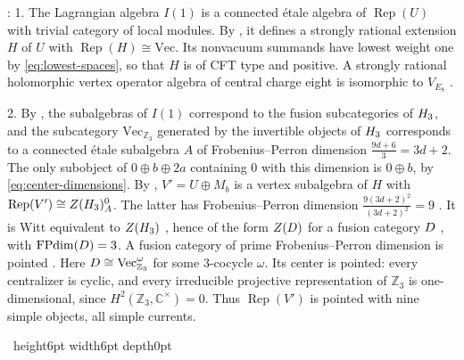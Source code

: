 \documentclass[leqno]{article}
\newcommand{\Cbb}{\ensuremath{\mathbb{C}}}
\let\cal\relax
\newcommand{\cal}{\mathcal}
\newcommand{\Z}{\ensuremath{\mathbb{Z}}}
\newcommand{\qed}{\hfill \vrule height6pt  width6pt depth0pt}
\DeclareMathOperator{\Rep}{Rep}
\newenvironment{proof}[1][]{\noindent {\it Proof #1} : }{\hbox{~}\qed
\smallskip
}
\numberwithin{equation}{section}
\begin{document}
\begin{proof}
1. The Lagrangian algebra $I(1)$ is a connected étale algebra of $\Rep(U)$ with trivial category of local modules. By \cite{HKL15,CKM22}, it defines a strongly rational extension $H$ of $U$ with $\Rep(H) \cong \mathrm{Vec}$. Its nonvacuum summands have lowest weight one by \eqref{eq:lowest-spaces}, so that $H$ is of CFT type and positive. A strongly rational holomorphic vertex operator algebra of central charge eight is isomorphic to $V_{E_8}$ \cite[Theorem 1 p.~2]{DoM04b}.

2. By \cite[Theorem 4.10 p.~18]{DMNO13}, the subalgebras of $I(1)$ correspond to the fusion subcategories of $\cal H_3$, and the subcategory $\mathrm{Vec}_{\Z_3}$ generated by the invertible objects of $\cal H_3$ corresponds to a connected étale subalgebra $A$ of Frobenius--Perron dimension $\frac{9d+6}{3} = 3d+2$. The only subobject of $0 \oplus b \oplus 2a$ containing $0$ with this dimension is $0 \oplus b$, by \eqref{eq:center-dimensions}. By \cite{HKL15}, $V' = U \oplus M_b$ is a vertex subalgebra of $H$ with $\Rep(V') \cong Z(\cal H_3)^0_A$. The latter has Frobenius--Perron dimension $\frac{9(3d+2)^2}{(3d+2)^2} = 9$ \cite[Corollary 3.32 p.~15]{DMNO13}. It is Witt equivalent to $Z(\cal H_3)$ \cite[Proposition 5.4 p.~22]{DMNO13}, hence of the form $Z(\cal D)$ for a fusion category $\cal D$ \cite[Proposition 5.8 p.~23]{DMNO13}, with $\operatorname{FPdim}(\cal D) = 3$. A fusion category of prime Frobenius--Perron dimension is pointed \cite[Corollary 8.30]{ENO05}. Here $\cal D \cong \mathrm{Vec}_{\Z_3}^{\omega}$ for some $3$-cocycle $\omega$. Its center is pointed: every centralizer is cyclic, and every irreducible projective representation of $\Z_3$ is one-dimensional, since $H^2(\Z_3,\Cbb^\times) = 0$. Thus $\Rep(V')$ is pointed with nine simple objects, all simple currents.


\end{proof}
\end{document}
